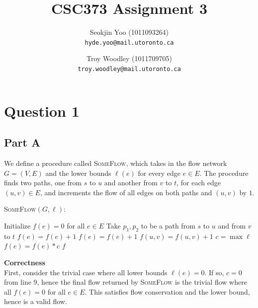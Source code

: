 \documentclass[11pt]{exam}
\begin{document}
\title{CSC373 Assignment 3}
\author{
  Seokjin Yoo (1011093264) \\
  \texttt{hyde.yoo@mail.utoronto.ca}
  \and
  Troy Woodley (1011709705) \\
  \texttt{troy.woodley@mail.utoronto.ca}
}
\maketitle

\section{Question 1}
\subsection{Part A}

We define a procedure called \textsc{SomeFlow}, which takes in the
flow network $G=(V,E)$ and the lower bounds $\ell(e)$ for every edge
$e \in E$. The procedure finds two paths, one from $s$ to $u$ and
another from $v$ to $t$, for each edge $(u,v) \in E$, and increments
the flow of all edges on both paths and $(u,v)$ by $1$.

\vspace{\baselineskip}
\noindent\textsc{SomeFlow}$( G , \ell )$:
\begin{algorithmic}[1]
  \State Initialize $ f(e) = 0 $ for all $e \in E$
   \label{1aouter1}
  \State Take $ p_1, p_2 $ to be a path from $ s $ to $ u $ and from
  $ v $ to $ t $ \label{1ainner1} 
   \label{1ainner2}
  \State $ f(e) = f(e) + 1 $
  \EndFor
   \label{1ainner3}
  \State $ f(e) = f(e) + 1 $
  \EndFor
  \State $ f(u, v) = f(u, v) + 1 $ \label{1ainner4}
  \EndFor
  \State $ c = \max{\ell} $ \label{1aouter2}
   \label{1aouter3}
  \State $ f(e) = f(e) * c $
  \EndFor
  \State\Return $ f $
\end{algorithmic}
\vspace{\baselineskip}

\noindent \textbf{Correctness}\\

First, consider the trivial case where all lower bounds $ \ell(e) = 0
$. If so, $c = 0$ from line 9, hence the final flow returned by
\textsc{SomeFlow} is the trivial flow where all $f(e) = 0$ for all $e
\in E$. This satisfies flow conservation and the lower bound, hence
is a valid flow.
\end{document}
